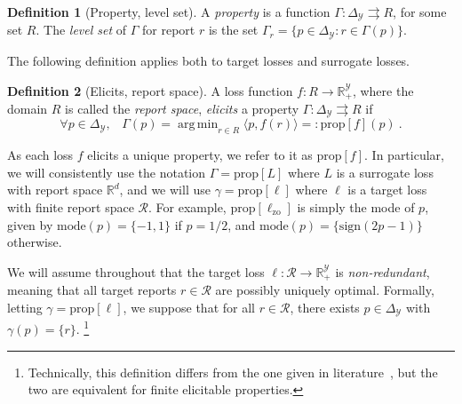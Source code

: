 \documentclass{article}
\theoremstyle{definition}\newtheorem{definition}{Definition}
\theoremstyle{definition}\newtheorem{assumption}{Assumption}
\DeclareMathOperator*{\argmin}{arg\,min}
\newcommand{\reals}{\mathbb{R}}
\newcommand{\prop}[1]{\mathrm{prop}[#1]}
\newcommand{\simplex}{\Delta_\Y}
\newcommand{\R}{\mathcal{R}}
\newcommand{\Y}{\mathcal{Y}}
\newcommand{\inprod}[2]{\langle #1, #2 \rangle}%
\newcommand{\toto}{\rightrightarrows}
\newcommand{\zeroone}{\ell_{\mathrm{zo}}}
\newcommand{\sign}{\mathrm{sign}}
\newcommand{\mode}{\mathrm{mode}}
\begin{document}
\begin{definition}[Property, level set]\label{def:property}
  A \emph{property} is a function $\Gamma:\simplex\toto R$, for some set $R$.
  The \emph{level set} of $\Gamma$ for report $r$ is the set $\Gamma_r = \{p \in \simplex : r \in \Gamma(p)\}$.
\end{definition}
The following definition applies both to target losses and surrogate losses.
\begin{definition}[Elicits, report space]
  \label{def:elicits}
  A loss function $f:R\to\reals^\Y_+$, where the domain $R$ is called the \emph{report space}, \emph{elicits} a property $\Gamma:\simplex \toto R$ if
  \begin{equation}
    \forall p\in\simplex,\;\;\;\Gamma(p) = \argmin_{r \in R} \inprod{p}{f(r)} =: \prop{f}(p)~.
  \end{equation}
\end{definition}
As each loss $f$ elicits a unique property, we refer to it as $\prop{f}$.
In particular, we will consistently use the notation $\Gamma = \prop{L}$ where $L$ is a surrogate loss with report space $\reals^d$, and we will use $\gamma = \prop{\ell}$ where $\ell$ is a target loss with finite report space $\R$.
For example, $\prop{\zeroone}$ is simply the mode of $p$, given by $\mode(p) = \{-1,1\}$ if $p=1/2$, and $\mode(p) = \{\sign(2p-1)\}$ otherwise.

We will assume throughout that the target loss $\ell : \R \to \reals^\Y_+$ is \emph{non-redundant}, meaning that all target reports $r \in \R$ are possibly uniquely optimal.
Formally, letting $\gamma = \prop{\ell}$, we suppose that for all $r \in \R$, there exists $p \in \simplex$ with $\gamma(p) = \{r\}$.%
\footnote{Technically, this definition differs from the one given in literature~\cite{frongillo2014general,finocchiaro2019embedding}, but the two are equivalent for finite elicitable properties.}
\end{document}
